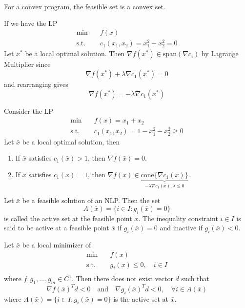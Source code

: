 For a convex program, the feasible set is a convex set.
\begin{example}
    If we have the LP
    \begin{align*}
        \min \quad & f(x) \\
        \text{s.t.} \quad & c_1(x_1,x_2) = x_1^2 + x_2^2 = 0 
    \end{align*}
    Let $x^*$ be a local optimal solution. Then $\nabla f(x^*) \in \mathrm{span}(\nabla c_i)$ by Lagrange Multiplier since
    $$\nabla f(x^*) + \lambda \nabla c_1(x^*) = 0$$ and rearranging gives
    $$\nabla f(x^*) = -\lambda \nabla c_1(x^*)$$
\end{example} 
\begin{example}
    Consider the LP
    \begin{align*}
        \min \quad & f(x) = x_1 + x_2 \\
        \text{s.t.} \quad & c_1(x_1,x_2) = 1 - x_1^2 - x_2^2 \geq 0 
    \end{align*}
    Let $\bar x$ be a local optimal solution, then
    \begin{enumerate}
        \item If $\bar x$ satisfies $c_1(\bar x) > 1$, then $\nabla f(\bar x) = 0$.
        \item If $\bar x$ satisfies $c_1(\bar x) = 1$, then $\nabla f(\bar x) \in \underbrace{\mathrm{cone}\{\nabla c_1(\bar x)\}}_{-\lambda \nabla c_1(\bar x), \lambda \leq 0}$.
    \end{enumerate}
\end{example}
\begin{definition}
    Let $\bar x$ be a feasible solution of an NLP. Then the set
    $$A(\bar x) = \{i \in I: g_i(\bar x) = 0\}$$ is called the active set at the feasible point $\bar x$. The inequality constraint $i \in I$ is said to be active at a feasible point $\bar x$ if $g_i(\bar x) = 0$ and inactive if $g_i(\bar x) < 0$.
\end{definition}
\begin{theorem}[]
    Let $\bar x$ be a local minimizer of 
    \begin{align*}
        \min \quad & f(x) \\
        \text{s.t.} \quad & g_i(x) \leq 0, \quad i \in I \\
    \end{align*}
    where $f, g_1,\ldots,g_m \in C^1$. Then there does not exist vector $d$ such that 
    $$\nabla f(\bar x)^Td < 0 \quad \text{and} \quad \nabla g_i(\bar x)^Td < 0, \quad \forall i \in A(\bar x)$$
    where $A(\bar x) = \{i \in I: g_i(\bar x) = 0\}$ is the active set at $\bar x$.
\end{theorem}
